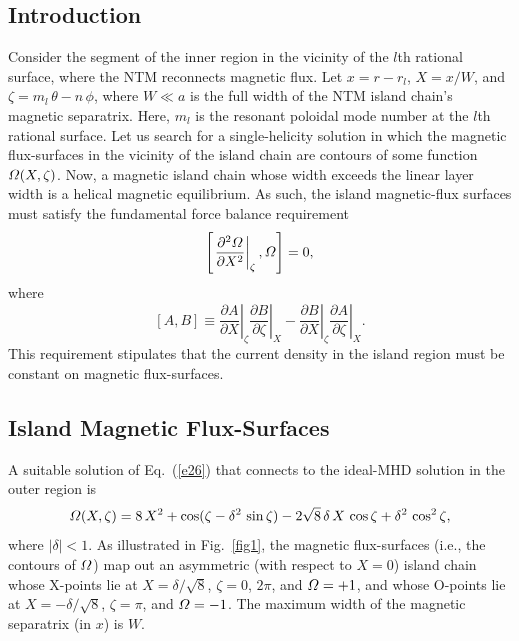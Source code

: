 \documentclass[12pt,prb,aps]{revtex4-1}
\begin{document}
\subsection{Introduction}
Consider the segment of the inner region in the vicinity of the $l$th rational surface, where the NTM reconnects magnetic flux. 
Let $x=r-r_{l}$, $X=x/W$, and $\zeta=m_{l}\,\theta-n\,\phi$, where $W\ll a$ is the full width  of the NTM island chain's magnetic separatrix. 
Here, $m_l$ is the resonant poloidal mode number at the $l$th rational surface. 
Let us search for a single-helicity solution in which the magnetic flux-surfaces in the vicinity of the island chain are contours of some function ${\mit\Omega}(X,\zeta)$.
Now, a magnetic island chain whose width exceeds the linear layer width is a helical magnetic equilibrium.\cite{ntm1} As such, the island magnetic-flux surfaces must satisfy the fundamental
force balance requirement\,\cite{island}
\begin{equation}\label{e26}
\left[\left.\frac{\partial^2{\mit\Omega}}{\partial X^2}\right|_\zeta,{\mit\Omega}\right]=0,
\end{equation}
where
\begin{equation}\label{poisson}
[A,B] \equiv \left.\frac{\partial A}{\partial X}\right|_\zeta \left.\frac{\partial B}{\partial\zeta}\right|_X- \left.\frac{\partial B}{\partial X}\right|_\zeta \left.\frac{\partial A}{\partial\zeta}\right|_X.
\end{equation}
This requirement stipulates that the current density in the island region must be constant on magnetic flux-surfaces. 

\subsection{Island Magnetic Flux-Surfaces}
A suitable solution of Eq.~(\ref{e26}) that connects to the ideal-MHD solution in the outer region is\,\cite{island}
\begin{equation}\label{e45}
{\mit\Omega}(X,\zeta) = 8\,X^2 + \cos(\zeta-\delta^2\,\sin\zeta) - 2\sqrt{8}\,\delta\,X\,\cos\zeta+\delta^2\,\cos^2\zeta,
\end{equation}
where $|\delta|<1$.  As illustrated in Fig.~\ref{fig1}, the magnetic flux-surfaces  (i.e., the contours of ${\mit\Omega}$) map out an
asymmetric (with respect to $X=0$) island chain whose 
X-points lie at $X=\delta/\sqrt{8}$, $\zeta = 0$, $2\pi$, and ${\mit\Omega}=+1$,  and whose  O-points lie at
$X=-\delta/\sqrt{8}$,  $\zeta=\pi$, and ${\mit\Omega}=-1$. The maximum width of the magnetic separatrix (in $x$) is $W$. 
\end{document}
